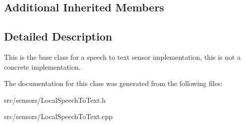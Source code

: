 \subsection*{Additional Inherited Members}


\subsection{Detailed Description}
This is the base class for a speech to text sensor implementation, this is not a concrete implementation. 

The documentation for this class was generated from the following files\+:\begin{DoxyCompactItemize}
\item 
src/sensors/Local\+Speech\+To\+Text.\+h\item 
src/sensors/Local\+Speech\+To\+Text.\+cpp\end{DoxyCompactItemize}

